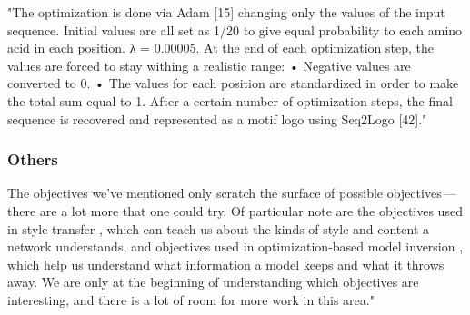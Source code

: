 \documentclass[]{scrartcl}
\begin{document}
	"The optimization is done via Adam [15] changing only the values of the input sequence. Initial values are all set as 1/20 to give equal probability to each amino acid in each position. λ = 0.00005. At the end of each optimization step, the values are forced to stay withing a realistic range:
	• Negative values are converted to 0.
	• The values for each position are standardized in order to make the total sum equal to 1.
	After a certain number of optimization steps, the final sequence is recovered and represented as a motif logo using Seq2Logo [42]." \cite{Fontal2017}

	\subsubsection{Others}
	The objectives we've mentioned only scratch the surface of possible objectives --- there are a lot more that one could try. Of particular note are the objectives used in style transfer \cite{Gatys2016}, which can teach us about the kinds of style and content a network understands, and objectives used in optimization-based model inversion \cite{Mahendran2015}, which help us understand what information a model keeps and what it throws away. We are only at the beginning of understanding which objectives are interesting, and there is a lot of room for more work in this area." \cite{Olah2017}
\end{document}
